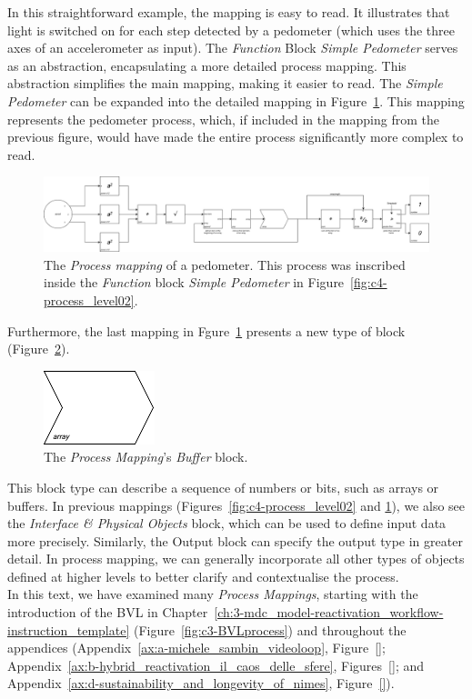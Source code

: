 In this straightforward example, the mapping is easy to read. It illustrates that light is switched on for each step detected by a pedometer (which uses the three axes of an accelerometer as input). The \textit{Function} Block \textit{Simple Pedometer} serves as an abstraction, encapsulating a more detailed process mapping. This abstraction simplifies the main mapping, making it easier to read. The \textit{Simple Pedometer} can be expanded into the detailed mapping in Figure~\ref{fig:c4-process_level03}. This mapping represents the pedometer process, which, if included in the mapping from the previous figure, would have made the entire process significantly more complex to read.
\begin{figure}[!h]
    \centering
    \includegraphics[width=\linewidth]{chapters/4-MDC_model_application/image/bvl-process_level03.png}
    \caption{The \textit{Process mapping} of a pedometer. This process was inscribed inside the \textit{Function} block \textit{Simple Pedometer} in Figure~\ref{fig:c4-process_level02}.}
    \label{fig:c4-process_level03}
\end{figure}
Furthermore, the last mapping in Fgure~\ref{fig:c4-process_level03} presents a new type of block (Figure~\ref{fig:c4-bvl-buffer}). 
\begin{figure}[!h]
    \centering
    \includegraphics[width=0.2\linewidth]{chapters/4-MDC_model_application/image/bvl-bufferblock.png}
    \caption{The \textit{Process Mapping}'s \textit{Buffer} block.}
    \label{fig:c4-bvl-buffer}
\end{figure}
This block type can describe a sequence of numbers or bits, such as arrays or buffers. In previous mappings (Figures~\ref{fig:c4-process_level02} and \ref{fig:c4-process_level03}), we also see the \textit{Interface & Physical Objects} block, which can be used to define input data more precisely. Similarly, the Output block can specify the output type in greater detail.
In process mapping, we can generally incorporate all other types of objects defined at higher levels to better clarify and contextualise the process.\\
In this text, we have examined many \textit{Process Mappings}, starting with the introduction of the BVL in Chapter~\ref{ch:3-mdc_model-reactivation_workflow-instruction_template} (Figure~\ref{fig:c3-BVLprocess}) and throughout the appendices (Appendix~\ref{ax:a-michele_sambin_videoloop}, Figure~\ref{}; Appendix~\ref{ax:b-hybrid_reactivation_il_caos_delle_sfere}, Figures~\ref{}; and Appendix~\ref{ax:d-sustainability_and_longevity_of_nimes}, Figure~\ref{}).

